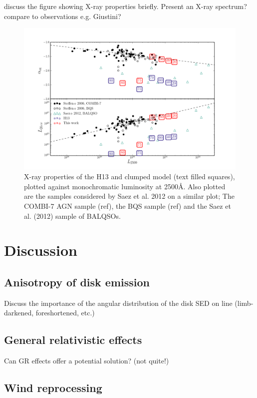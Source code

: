 \documentclass[useAMS,usenatbib]{mn2e_x}
\begin{document}
discuss the figure showing X-ray properties briefly. 
Present an X-ray spectrum? compare to observations e.g. Giustini?

\begin{figure}
\centering
\includegraphics[width=1.0\textwidth]{figures/alpha_ox_both.png}
\caption
{
X-ray properties of the H13 and clumped model (text filled 
squares), plotted against monochromatic luminosity 
at 2500\AA. Also plotted are the samples considered by
Saez et al. 2012 on a similar plot; The COMBI-7 AGN sample (ref),
the BQS sample (ref) and the Saez et al. (2012) sample of BALQSOs.
}
\label{fig:alpha_ox}
\end{figure}


\section{Discussion}

\subsection{Anisotropy of disk emission}

Discuss the importance of the angular distribution of the disk SED on line
(limb-darkened, foreshortened, etc.)

\subsection{General relativistic effects}

Can GR effects offer a potential solution? (not quite!)

\subsection{Wind reprocessing}
\end{document}
